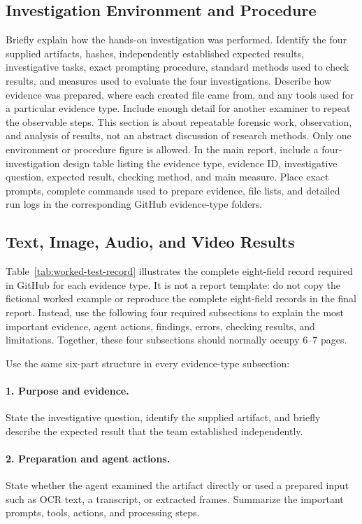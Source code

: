 \documentclass[12pt,letterpaper]{article}
\begin{document}
\subsection{Investigation Environment and Procedure}
Briefly explain how the hands-on investigation was performed. Identify the four supplied artifacts, hashes, independently established expected results, investigative tasks, exact prompting procedure, standard methods used to check results, and measures used to evaluate the four investigations. Describe how evidence was prepared, where each created file came from, and any tools used for a particular evidence type. Include enough detail for another examiner to repeat the observable steps. This section is about repeatable forensic work, observation, and analysis of results, not an abstract discussion of research methods. Only one environment or procedure figure is allowed.
In the main report, include a four-investigation design table listing the evidence type, evidence ID, investigative question, expected result, checking method, and main measure. Place exact prompts, complete commands used to prepare evidence, file lists, and detailed run logs in the corresponding GitHub evidence-type folders.

\subsection{Text, Image, Audio, and Video Results}
Table~\ref{tab:worked-test-record} illustrates the complete eight-field record required in GitHub for each evidence type. It is not a report template: do not copy the fictional worked example or reproduce the complete eight-field records in the final report. Instead, use the following four required subsections to explain the most important evidence, agent actions, findings, errors, checking results, and limitations. Together, these four subsections should normally occupy 6--7 pages.

Use the same six-part structure in every evidence-type subsection:
\paragraph{1. Purpose and evidence.} State the investigative question, identify the supplied artifact, and briefly describe the expected result that the team established independently.
\paragraph{2. Preparation and agent actions.} State whether the agent examined the artifact directly or used a prepared input such as OCR text, a transcript, or extracted frames. Summarize the important prompts, tools, actions, and processing steps.
\end{document}
